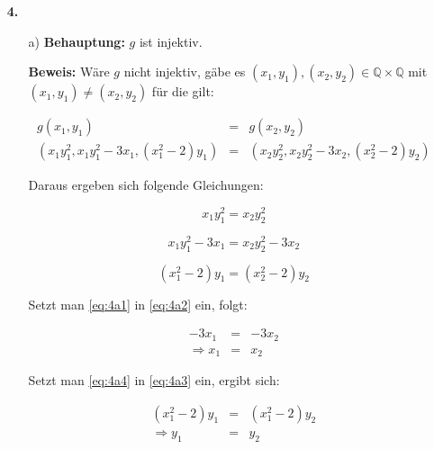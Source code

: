 \documentclass[a4paper,10pt]{scrartcl}
\begin{document}
\begin{enumerate}
    \item[\textbf{4.}]
        \begin{enumerate}
            \item[a)]
                \textbf{Behauptung:} $g$ ist injektiv.

                \textbf{Beweis:} Wäre $g$ nicht injektiv, gäbe es $(x_1, y_1), (x_2, y_2) \in \mathbb{Q} \times \mathbb{Q}$
                mit $(x_1, y_1) \not= (x_2, y_2)$ für die gilt:

                $$\begin{array}{rcl}
                    g(x_1, y_1) &=& g(x_2, y_2)\\[1em]
                    (x_1 y_1^2, x_1 y_1^2 - 3 x_1, (x_1^2 - 2) y_1) &=& (x_2 y_2^2, x_2 y_2^2 - 3 x_2, (x_2^2 - 2) y_2)
                \end{array}$$

                Daraus ergeben sich folgende Gleichungen:

                \begin{equation}\label{eq:4a1}
                    x_1 y_1^2 = x_2 y_2^2
                \end{equation}

                \begin{equation}\label{eq:4a2}
                    x_1 y_1^2 - 3 x_1 = x_2 y_2^2 - 3 x_2
                \end{equation}

                \begin{equation}\label{eq:4a3}
                    (x_1^2 - 2) y_1 = (x_2^2 - 2) y_2
                \end{equation}

                Setzt man \eqref{eq:4a1} in \eqref{eq:4a2} ein, folgt:

                \begin{equation}\label{eq:4a4}\begin{array}{rcl}
                    -3 x_1 &=& -3 x_2\\
                    \Rightarrow x_1 &=& x_2
                \end{array}\end{equation}

                Setzt man \eqref{eq:4a4} in \eqref{eq:4a3} ein, ergibt sich:

                $$\begin{array}{rcl}
                    (x_1^2 - 2) y_1 &=& (x_1^2 - 2) y_2\\
                    \Rightarrow y_1 &=& y_2
                \end{array}$$


\end{enumerate}
\end{enumerate}
\end{document}
